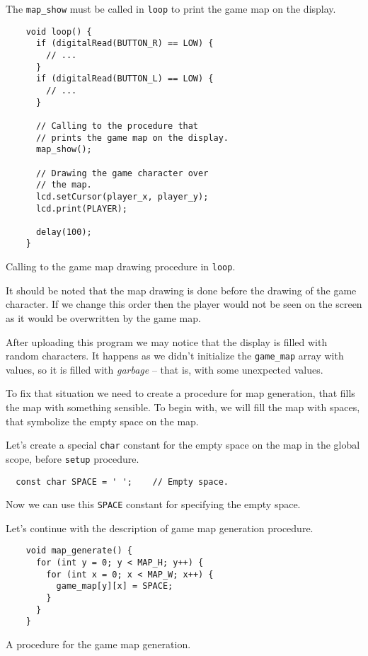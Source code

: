 \documentclass[../sparc.tex]{subfiles}
\begin{document}
The \texttt{map_show} must be called in \texttt{loop} to print
the game map on the display.

\begin{listing}[H]
  \begin{verbatim}
    void loop() {
      if (digitalRead(BUTTON_R) == LOW) {
        // ...
      }
      if (digitalRead(BUTTON_L) == LOW) {
        // ...
      }

      // Calling to the procedure that
      // prints the game map on the display.
      map_show();

      // Drawing the game character over
      // the map.
      lcd.setCursor(player_x, player_y);
      lcd.print(PLAYER);

      delay(100);
    }
  \end{verbatim}
  \caption{Calling to the game map drawing procedure in \texttt{loop}.}
  \label{listing:game-dev-map-show-call}
\end{listing}

It should be noted that the map drawing is done before the drawing of the game
character.  If we change this order then the player would not be seen on the
screen as it would be overwritten by the game map.

After uploading this program we may notice that the display is filled with
random characters.  It happens as we didn't initialize the
\texttt{game_map} array with values, so it is filled with
\emph{garbage} -- that is, with some unexpected values.

To fix that situation we need to create a procedure for map generation, that
fills the map with something sensible.  To begin with, we will fill the map with
spaces, that symbolize the empty space on the map.

Let's create a special \texttt{char} constant for the empty space on
the map in the global scope, before \texttt{setup} procedure.

\begin{verbatim}
  const char SPACE = ' ';    // Empty space.
\end{verbatim}

Now we can use this \texttt{SPACE} constant for specifying the empty
space.

Let's continue with the description of game map generation procedure.

\begin{listing}[H]
  \begin{verbatim}
    void map_generate() {
      for (int y = 0; y < MAP_H; y++) {
        for (int x = 0; x < MAP_W; x++) {
          game_map[y][x] = SPACE;
        }
      }
    }
  \end{verbatim}
  \caption{A procedure for the game map generation.}
  \label{listing:game-dev-map-generate}
\end{listing}
\end{document}
